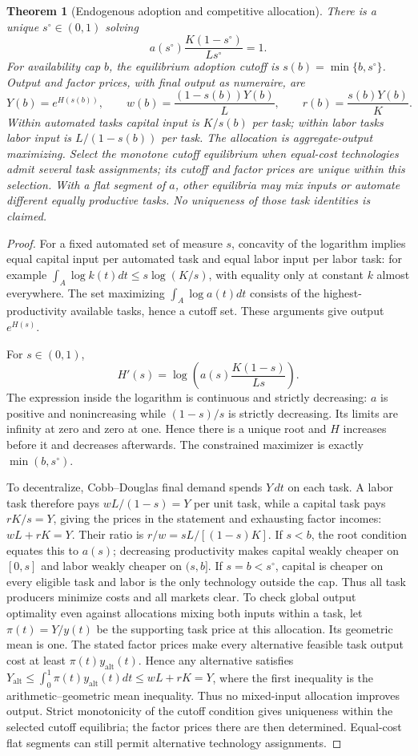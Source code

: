 \documentclass[11pt]{article}
\newtheorem{theorem}{Theorem}
\theoremstyle{remark}\newtheorem{remark}[theorem]{Remark}
\begin{document}
\begin{theorem}[Endogenous adoption and competitive allocation]
There is a unique $s^\circ\in(0,1)$ solving
\[
 a(s^\circ)\frac{K(1-s^\circ)}{Ls^\circ}=1.
\]
For availability cap $b$, the equilibrium adoption cutoff is
$s(b)=\min\{b,s^\circ\}$. Output and factor prices, with final output as numeraire, are
\[
 Y(b)=e^{H(s(b))},\qquad
 w(b)=\frac{(1-s(b))Y(b)}L,\qquad
 r(b)=\frac{s(b)Y(b)}K.
\]
Within automated tasks capital input is $K/s(b)$ per task; within labor tasks labor input is $L/(1-s(b))$ per task. The allocation is aggregate-output maximizing. Select the monotone cutoff equilibrium when equal-cost technologies admit several task assignments; its cutoff and factor prices are unique within this selection. With a flat segment of $a$, other equilibria may mix inputs or automate different equally productive tasks. No uniqueness of those task identities is claimed.
\end{theorem}
\begin{proof}
For a fixed automated set of measure $s$, concavity of the logarithm implies equal capital input per automated task and equal labor input per labor task: for example
$\int_A\log k(t)dt\le s\log(K/s)$, with equality only at constant $k$ almost everywhere. The set maximizing $\int_A\log a(t)dt$ consists of the highest-productivity available tasks, hence a cutoff set. These arguments give output $e^{H(s)}$.

For $s\in(0,1)$,
\[
 H'(s)=\log\left(a(s)\frac{K(1-s)}{Ls}\right).
\]
The expression inside the logarithm is continuous and strictly decreasing: $a$ is positive and nonincreasing while $(1-s)/s$ is strictly decreasing. Its limits are infinity at zero and zero at one. Hence there is a unique root and $H$ increases before it and decreases afterwards. The constrained maximizer is exactly $\min(b,s^\circ)$.

To decentralize, Cobb--Douglas final demand spends $Y\,dt$ on each task. A labor task therefore pays $wL/(1-s)=Y$ per unit task, while a capital task pays $rK/s=Y$, giving the prices in the statement and exhausting factor incomes: $wL+rK=Y$. Their ratio is $r/w=sL/[(1-s)K]$. If $s<b$, the root condition equates this to $a(s)$; decreasing productivity makes capital weakly cheaper on $[0,s]$ and labor weakly cheaper on $(s,b]$. If $s=b<s^\circ$, capital is cheaper on every eligible task and labor is the only technology outside the cap. Thus all task producers minimize costs and all markets clear. To check global output optimality even against allocations mixing both inputs within a task, let $\pi(t)=Y/y(t)$ be the supporting task price at this allocation. Its geometric mean is one. The stated factor prices make every alternative feasible task output cost at least $\pi(t)y_{\mathrm{alt}}(t)$. Hence any alternative satisfies $Y_{\mathrm{alt}}\le\int_0^1\pi(t)y_{\mathrm{alt}}(t)dt\le wL+rK=Y$, where the first inequality is the arithmetic--geometric mean inequality. Thus no mixed-input allocation improves output. Strict monotonicity of the cutoff condition gives uniqueness within the selected cutoff equilibria; the factor prices there are then determined. Equal-cost flat segments can still permit alternative technology assignments.
\end{proof}
\end{document}
